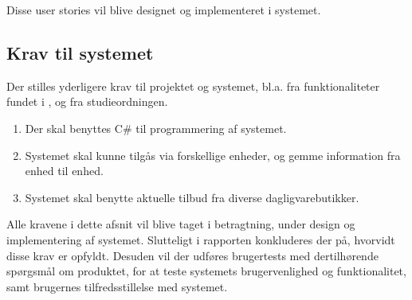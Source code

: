Disse user stories vil blive designet og implementeret i systemet.

\subsection{Krav til systemet}

Der stilles yderligere krav til projektet og systemet, bl.a. fra funktionaliteter fundet i , og fra studieordningen.
\begin{enumerate}
\item Der skal benyttes C\# til programmering af systemet.
\item Systemet skal kunne tilgås via forskellige enheder, og gemme information fra enhed til enhed.
\item Systemet skal benytte aktuelle tilbud fra diverse dagligvarebutikker.
\end{enumerate}

Alle kravene i dette afsnit vil blive taget i betragtning, under design og implementering af systemet.
Slutteligt i rapporten konkluderes der på, hvorvidt disse krav er opfyldt.
Desuden vil der udføres brugertests med dertilhørende spørgsmål om produktet, for at teste systemets brugervenlighed og funktionalitet, samt brugernes tilfredsstillelse med systemet.
